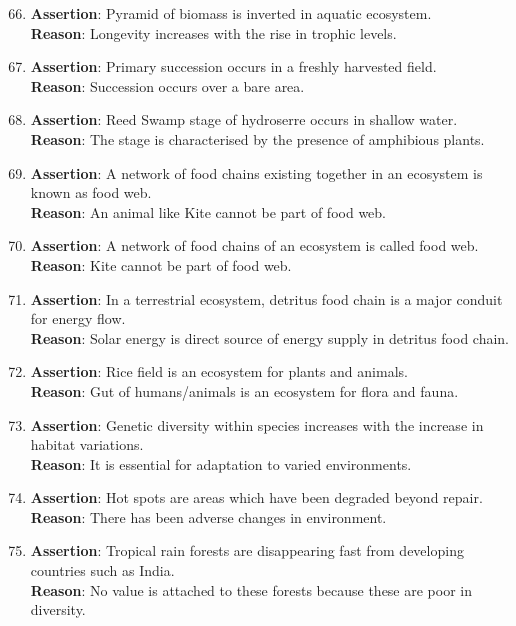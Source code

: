 \documentclass{article}
\begin{document}
\begin{enumerate}
    \setcounter{enumi}{65}
    \item \textbf{Assertion}: Pyramid of biomass is inverted in aquatic ecosystem. \\
    \textbf{Reason}: Longevity increases with the rise in trophic levels.
    \item \textbf{Assertion}: Primary succession occurs in a freshly harvested field. \\
    \textbf{Reason}: Succession occurs over a bare area.
    \item \textbf{Assertion}: Reed Swamp stage of hydroserre occurs in shallow water. \\
    \textbf{Reason}: The stage is characterised by the presence of amphibious plants.
    \item \textbf{Assertion}: A network of food chains existing together in an ecosystem is known as food web. \\
    \textbf{Reason}: An animal like Kite cannot be part of food web.
    \item \textbf{Assertion}: A network of food chains of an ecosystem is called food web. \\
    \textbf{Reason}: Kite cannot be part of food web.
    \item \textbf{Assertion}: In a terrestrial ecosystem, detritus food chain is a major conduit for energy flow. \\
    \textbf{Reason}: Solar energy is direct source of energy supply in detritus food chain.
    \item \textbf{Assertion}: Rice field is an ecosystem for plants and animals. \\
    \textbf{Reason}: Gut of humans/animals is an ecosystem for flora and fauna.
    \item \textbf{Assertion}: Genetic diversity within species increases with the increase in habitat variations. \\
    \textbf{Reason}: It is essential for adaptation to varied environments.
    \item \textbf{Assertion}: Hot spots are areas which have been degraded beyond repair. \\
    \textbf{Reason}: There has been adverse changes in environment.
    \item \textbf{Assertion}: Tropical rain forests are disappearing fast from developing countries such as India. \\
    \textbf{Reason}: No value is attached to these forests because these are poor in diversity.
  \end{enumerate}
\end{document}
